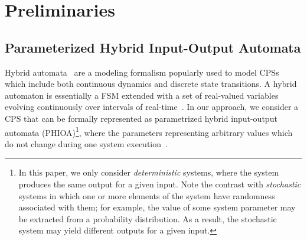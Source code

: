 \section{Preliminaries}





\subsection{Parameterized Hybrid Input-Output Automata}
Hybrid automata~\cite{alur1995algorithmic} are a modeling formalism popularly used to model CPSs which include both continuous dynamics and discrete state transitions. A hybrid automaton is essentially a FSM extended with a set of real-valued variables evolving continuously over intervals of real-time~\cite{alur1995algorithmic}. In our approach, we consider a CPS that can be formally represented as parametrized hybrid input-output automata (PHIOA)\footnote{In this paper, we only consider \emph{deterministic} systems, where the system produces the same output for a given input. Note the contrast with {\em stochastic} systems in which one or more elements of the system have randomness associated with them; for example, the value of some system parameter may be extracted from a probability distribution. As a result, the stochastic system may yield different outputs for a given input.}, where the parameters representing arbitrary values which do not change during one system execution~\cite{frehse2008counterexample, schwarz2011modelling}. 
